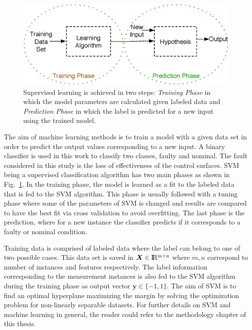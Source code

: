 \begin{figure}
\begin{center}
\includegraphics[width=12cm]{figures/supervisedLearningBasics}    %
\caption{Supervised learning is achieved in two steps: \emph{Training Phase} in which the model parameters are calculated given labeled data and \emph{Prediction Phase} in which the label is predicted for a new input using the trained model.} 
\label{fig:supervisedLearning}
\end{center}
\end{figure}

The aim of machine learning methods is to train a model with a given data set in order to predict the output values corresponding to a new input.
A binary classifier is used in this work to classify two classes, faulty and nominal. 
The fault considered in this study is the loss of effectiveness of the control surfaces. 
SVM being a supervised classification algorithm has two main phases as shown in Fig.~\ref{fig:supervisedLearning}. 
In the training phase, the model is learned as a fit to the labeled data that is fed to the SVM algorithm. 
This phase is usually followed with a tuning phase where some of the parameters of SVM is changed and results are compared to have the best fit via cross validation to avoid overfitting. 
The last phase is the prediction, where for a new instance the classifier predicts if it corresponds to a faulty or nominal condition.

Training data is comprised of labeled data where the label can belong to one of two possible cases. 
This data set is saved in $\bm{X} \in {\rm I\!R^{m \times n}}  $ where $m,n$ correspond to number of instances and features respectively. 
The label information corresponding to the measurement instances is also fed to the SVM algorithm during the training phase as output vector $\bm{y} \in \{-1,1\}$. 
The aim of SVM is to find an optimal hyperplane maximizing the margin by solving the optimization problem for non-linearly separable datasets. For further details on SVM and machine learning in general, the reader could refer to the methodology chapter of this thesis.

